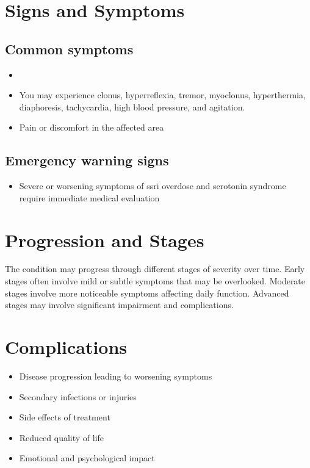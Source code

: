 \section{Signs and Symptoms}

\subsection{Common symptoms}
\begin{itemize}[noitemsep]
  \item \item You may experience clonus, hyperreflexia, tremor, myoclonus, hyperthermia, diaphoresis, tachycardia, high blood pressure, and agitation.

  \item Pain or discomfort in the affected area
  \end{itemize}

\subsection{Emergency warning signs}
\begin{itemize}[noitemsep]
  \item Severe or worsening symptoms of ssri overdose and serotonin syndrome require immediate medical evaluation
\end{itemize}
\section{Progression and Stages}
The condition may progress through different stages of severity over time. Early stages often involve mild or subtle symptoms that may be overlooked. Moderate stages involve more noticeable symptoms affecting daily function. Advanced stages may involve significant impairment and complications.
\section{Complications}
\begin{itemize}[noitemsep]
  \item Disease progression leading to worsening symptoms
  \item Secondary infections or injuries
  \item Side effects of treatment
  \item Reduced quality of life
  \item Emotional and psychological impact
\end{itemize}
